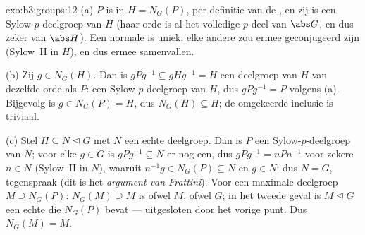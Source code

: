 \begin{solution}{exo:b3:groups:12}
(a) $P$ is  in $H = N_G(P)$, per definitie van de
, en zij is een Sylow-$p$-deelgroep van $H$ (haar orde
is al het volledige $p$-deel van $\abs G$, en dus zeker van $\abs
H$). Een normale  is uniek: elke andere zou ermee
geconjugeerd zijn (Sylow~II in $H$), en dus ermee samenvallen.

(b) Zij $g \in N_G(H)$. Dan is $gPg^{-1} \subseteq gHg^{-1} = H$
een deelgroep van $H$ van dezelfde orde als $P$: een
Sylow-$p$-deelgroep van $H$, dus $gPg^{-1} = P$ volgens (a).
Bijgevolg is $g \in N_G(P) = H$, dus $N_G(H) \subseteq H$; de
omgekeerde inclusie is triviaal.

(c) Stel $H \subseteq N \trianglelefteq G$ met $N$ een echte
deelgroep. Dan is $P$ een Sylow-$p$-deelgroep van $N$; voor elke $g
\in G$ is $gPg^{-1} \subseteq N$ er nog een, dus $gPg^{-1} =
nPn^{-1}$ voor zekere $n \in N$ (Sylow~II in $N$), waaruit $n^{-1}g
\in N_G(P) \subseteq N$ en $g \in N$: dus $N = G$, tegenspraak (dit
is het \emph{argument van Frattini}). Voor een maximale deelgroep
$M \supseteq N_G(P)$: $N_G(M) \supseteq M$ is ofwel $M$, ofwel $G$;
in het tweede geval is $M \trianglelefteq G$ een echte 
die $N_G(P)$ bevat --- uitgesloten door het vorige punt. Dus
$N_G(M) = M$.
\end{solution}

